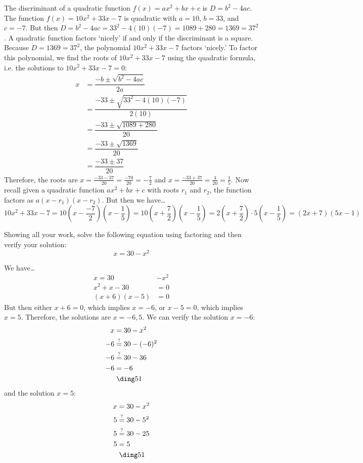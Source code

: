 \documentclass[11pt,letterpaper]{article}
\begin{document}
\sol The discriminant of a quadratic function $f(x)= ax^2 + bx + c$ is $D= b^2 - 4ac$. The function $f(x)= 10x^2 + 33x - 7$ is quadratic with $a= 10$, $b= 33$, and $c= -7$. But then $D= b^2 - 4ac= 33^2 - 4(10)(-7)= 1089 + 280= 1369= 37^2$. A quadratic function factors `nicely' if and only if the discriminant is a square. Because $D= 1369= 37^2$, the polynomial $10x^2 + 33x - 7$ factors `nicely.' To factor this polynomial, we find the roots of $10x^2 + 33x - 7$ using the quadratic formula, i.e. the solutions to $10x^2 + 33x - 7= 0$:
	\[
	\begin{aligned}
	x&= \dfrac{-b \pm \sqrt{b^2 - 4ac}}{2a} \\
	&= \dfrac{-33 \pm \sqrt{33^2 - 4(10)(-7)}}{2(10)} \\
	&= \dfrac{-33 \pm \sqrt{1089 + 280}}{20} \\
	&= \dfrac{-33 \pm \sqrt{1369}}{20} \\
	&= \dfrac{-33 \pm 37}{20} 
	\end{aligned}
	\]
Therefore, the roots are $x= \frac{-33 - 37}{20}= \frac{-70}{20}= -\frac{7}{2}$ and $x= \frac{-33 + 37}{20}= \frac{4}{20}= \frac{1}{5}$. Now recall given a quadratic function $ax^2 + bx + c$ with roots $r_1$ and $r_2$, the function factors as $a(x - r_1)(x - r_2)$. But then we have\dots
	\[
	10x^2 + 33x - 7= 10 \left(x - \dfrac{-7}{2} \right) \left(x - \dfrac{1}{5} \right)= 10 \left(x + \dfrac{7}{2} \right) \left(x - \dfrac{1}{5} \right)= 2 \left(x + \dfrac{7}{2} \right) \cdot 5 \left(x - \dfrac{1}{5} \right)= (2x + 7)(5x - 1)
	\]



\newpage



 Showing all your work, solve the following equation using factoring and then verify your solution:
	\[
	x= 30 - x^2
	\] \pspace

\sol We have\dots
	\[
	\begin{aligned}
	x= 30 &- x^2 \\[0.3cm]
	x^2 + x - 30&= 0 \\[0.3cm]
	(x + 6)(x - 5)&= 0 
	\end{aligned}
	\]
But then either $x + 6= 0$, which implies $x= -6$, or $x - 5= 0$, which implies $x= 5$. Therefore, the solutions are $x= -6, 5$. We can verify the solution $x= -6$:
	\[
	\begin{aligned}
	x&= 30 - x^2 \\
	-6 &\stackrel{?}{=} 30 - (-6)^2 \\
	-6 &\stackrel{?}{=} 30 - 36 \\
	-6&= -6 \\
	&\;\text{\cmark}
	\end{aligned}
	\]
and the solution $x= 5$:
	\[
	\begin{aligned}
	x&= 30 - x^2 \\
	5 &\stackrel{?}{=} 30 - 5^2 \\
	5 &\stackrel{?}{=} 30 - 25 \\
	5&= 5 \\
	&\;\text{\cmark}
	\end{aligned}
	\]
\end{document}
